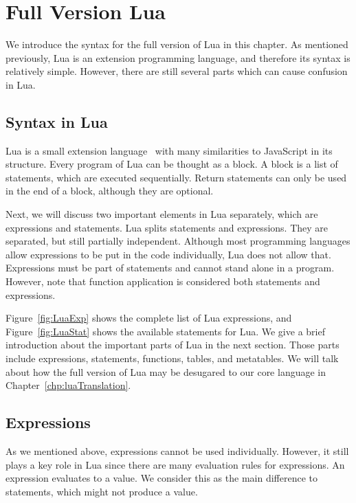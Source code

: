 \newcommand{\syntax}[2]{{\tt #1}{\tt ~::=}{\tt ~~#2}\\}
\newcommand{\syntaxcase}[1]{{\tt \quad\quad\quad\quad\quad\quad~}{\tt ~~#1}\\}
\newcommand{\mydefhead}[2]{\multicolumn{2}{l}{{#1}}&\mbox{\emph{#2}}\\}
\newcommand{\mydefcase}[2]{\qquad\qquad& #1 &\mbox{#2}\\}
\newcommand{\functiondef}[2]{\mbox{\tt function}~(\overline{#1_i})~#2~ {\tt end}}


\chapter{Full Version Lua}
We introduce the syntax for the full version of Lua in this chapter. As mentioned previously, Lua is an extension programming language, and therefore its syntax is relatively simple. However, there are still several parts which can cause confusion in Lua.

\section{Syntax in Lua}
Lua is a small extension language~\cite{PIL} with many similarities to JavaScript in its structure. Every program of Lua can be thought as a block. A block is a list of statements, which are executed sequentially. Return statements can only be used in the end of a block, although they are optional.

Next, we will discuss two important elements in Lua separately, which are expressions and statements.
Lua splits statements and expressions.
They are separated, but still partially independent. Although most programming languages allow expressions to be put in the code individually, Lua does not allow that. Expressions must be part of statements and cannot stand alone in a program. However, note that function application is considered both statements and expressions.

Figure~\ref{fig:LuaExp} shows the complete list of Lua expressions, and Figure~\ref{fig:LuaStat} shows the available statements for Lua. We give a brief introduction about the important parts of Lua in the next section. Those parts include expressions, statements, functions, tables, and metatables. We will talk about how the full version of Lua may be desugared to our core language in Chapter~\ref{chp:luaTranslation}.

\section{Expressions}
As we mentioned above, expressions cannot be used individually. However, it still plays a key role in Lua since there are many evaluation rules for expressions. An expression evaluates to a value. We consider this as the main difference to statements, which might not produce a value.

